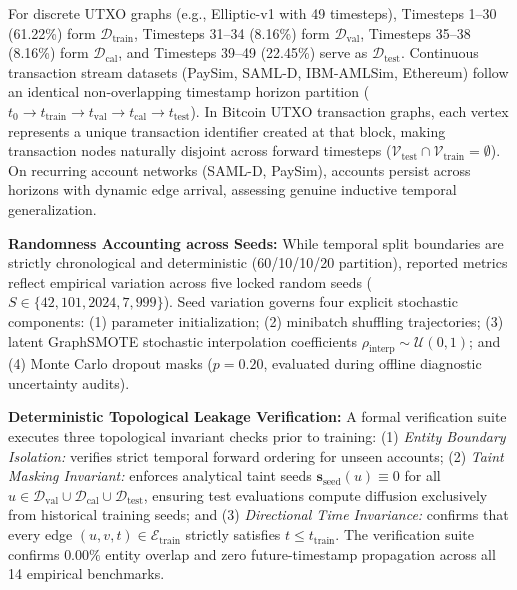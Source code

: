 For discrete UTXO graphs (e.g., Elliptic-v1 with 49 timesteps), Timesteps 1--30 (61.22\%) form $\mathcal{D}_{\text{train}}$, Timesteps 31--34 (8.16\%) form $\mathcal{D}_{\text{val}}$, Timesteps 35--38 (8.16\%) form $\mathcal{D}_{\text{cal}}$, and Timesteps 39--49 (22.45\%) serve as $\mathcal{D}_{\text{test}}$. Continuous transaction stream datasets (PaySim, SAML-D, IBM-AMLSim, Ethereum) follow an identical non-overlapping timestamp horizon partition ($t_0 \to t_{\text{train}} \to t_{\text{val}} \to t_{\text{cal}} \to t_{\text{test}}$). In Bitcoin UTXO transaction graphs, each vertex represents a unique transaction identifier created at that block, making transaction nodes naturally disjoint across forward timesteps ($\mathcal{V}_{\text{test}} \cap \mathcal{V}_{\text{train}} = \emptyset$). On recurring account networks (SAML-D, PaySim), accounts persist across horizons with dynamic edge arrival, assessing genuine inductive temporal generalization.

\textbf{Randomness Accounting across Seeds:} While temporal split boundaries are strictly chronological and deterministic (60/10/10/20 partition), reported metrics reflect empirical variation across five locked random seeds ($S \in \{42, 101, 2024, 7, 999\}$). Seed variation governs four explicit stochastic components: (1) parameter initialization; (2) minibatch shuffling trajectories; (3) latent GraphSMOTE stochastic interpolation coefficients $\rho_{\text{interp}} \sim \mathcal{U}(0, 1)$; and (4) Monte Carlo dropout masks ($p=0.20$, evaluated during offline diagnostic uncertainty audits).

\textbf{Deterministic Topological Leakage Verification:} A formal verification suite executes three topological invariant checks prior to training: (1) \textit{Entity Boundary Isolation:} verifies strict temporal forward ordering for unseen accounts; (2) \textit{Taint Masking Invariant:} enforces analytical taint seeds $\mathbf{s}_{\text{seed}}(u) \equiv 0$ for all $u \in \mathcal{D}_{\text{val}} \cup \mathcal{D}_{\text{cal}} \cup \mathcal{D}_{\text{test}}$, ensuring test evaluations compute diffusion exclusively from historical training seeds; and (3) \textit{Directional Time Invariance:} confirms that every edge $(u, v, t) \in \mathcal{E}_{\text{train}}$ strictly satisfies $t \le t_{\text{train}}$. The verification suite confirms $0.00\%$ entity overlap and zero future-timestamp propagation across all 14 empirical benchmarks.

